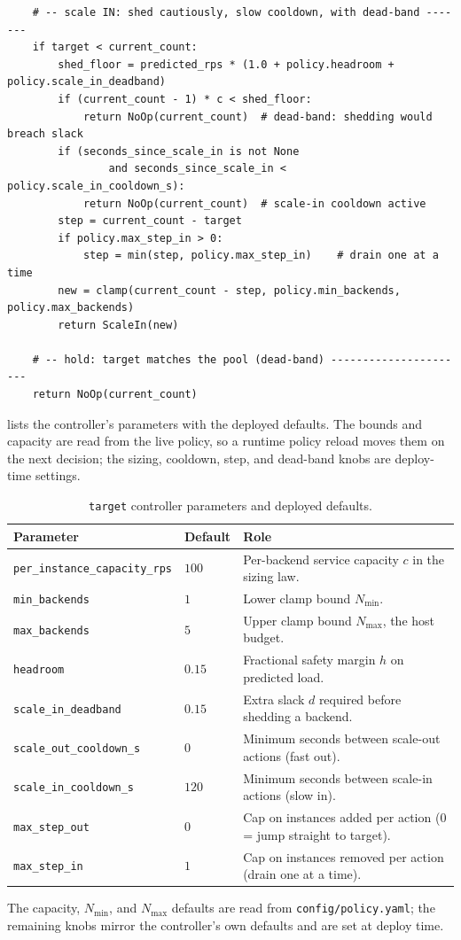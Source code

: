\begin{lstlisting}
    # -- scale IN: shed cautiously, slow cooldown, with dead-band -------
    if target < current_count:
        shed_floor = predicted_rps * (1.0 + policy.headroom + policy.scale_in_deadband)
        if (current_count - 1) * c < shed_floor:
            return NoOp(current_count)  # dead-band: shedding would breach slack
        if (seconds_since_scale_in is not None
                and seconds_since_scale_in < policy.scale_in_cooldown_s):
            return NoOp(current_count)  # scale-in cooldown active
        step = current_count - target
        if policy.max_step_in > 0:
            step = min(step, policy.max_step_in)    # drain one at a time
        new = clamp(current_count - step, policy.min_backends, policy.max_backends)
        return ScaleIn(new)

    # -- hold: target matches the pool (dead-band) ----------------------
    return NoOp(current_count)
\end{lstlisting}

 lists the controller's parameters with the deployed
defaults. The bounds and capacity are read from the live policy, so a runtime
policy reload moves them on the next decision; the sizing, cooldown, step, and
dead-band knobs are deploy-time settings.

\begin{table}[ht]
  \centering
  \caption[Target controller parameters and defaults]{\texttt{target} controller parameters and deployed defaults.}
  \label{bm:tab:target-params}
  \small
  \begin{tabularx}{\linewidth}{@{}l l Y@{}}
    \toprule
    \textbf{Parameter} & \textbf{Default} & \textbf{Role} \\
    \midrule
    \texttt{per\_instance\_capacity\_rps} & $100$ & Per-backend service capacity $c$ in the sizing law. \\
    \addlinespace
    \texttt{min\_backends} & $1$ & Lower clamp bound $N_{\min}$. \\
    \texttt{max\_backends} & $5$ & Upper clamp bound $N_{\max}$, the host budget. \\
    \addlinespace
    \texttt{headroom} & $0.15$ & Fractional safety margin $h$ on predicted load. \\
    \texttt{scale\_in\_deadband} & $0.15$ & Extra slack $d$ required before shedding a backend. \\
    \addlinespace
    \texttt{scale\_out\_cooldown\_s} & $0$ & Minimum seconds between scale-out actions (fast out). \\
    \texttt{scale\_in\_cooldown\_s} & $120$ & Minimum seconds between scale-in actions (slow in). \\
    \addlinespace
    \texttt{max\_step\_out} & $0$ & Cap on instances added per action ($0$ = jump straight to target). \\
    \texttt{max\_step\_in} & $1$ & Cap on instances removed per action (drain one at a time). \\
    \bottomrule
  \end{tabularx}
\end{table}

The capacity, $N_{\min}$, and $N_{\max}$ defaults are read from
\texttt{config/policy.yaml}; the remaining knobs mirror the controller's own
defaults and are set at deploy time.
